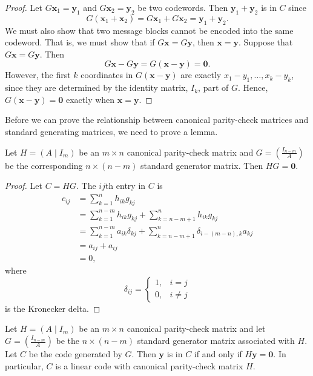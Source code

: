  
\begin{proof}
Let $G {\mathbf x}_1 = {\mathbf y}_1$ and $G {\mathbf
x}_2 ={\mathbf y}_2$ be two codewords. Then ${\mathbf y}_1
+ {\mathbf y}_2$ is in $C$ since 
\[
G( {\mathbf x}_1 + {\mathbf x}_2)
=
G {\mathbf x}_1 + G {\mathbf x}_2
=
{\mathbf y}_1 + {\mathbf y}_2.
\]
We must also show that two message blocks cannot be encoded into the
same codeword. That is, we must show that if $G {\mathbf x} = G
{\mathbf y}$, then ${\mathbf x} = {\mathbf y}$.  Suppose that $G
{\mathbf x} = G {\mathbf y}$. Then
\[
G {\mathbf x} - G {\mathbf y}
=
G( {\mathbf x} - {\mathbf y})
=
{\mathbf 0}.
\]
However, the first $k$ coordinates in $G( {\mathbf x} - {\mathbf
y})$ are exactly $x_1 -y_1, \ldots, x_k - y_k$, since they are
determined by the identity matrix, $I_k$, part of $G$. Hence, $G(
{\mathbf x} - {\mathbf y}) = {\mathbf 0}$ exactly when
${\mathbf x} = {\mathbf y}$.
\end{proof}
 
 \medskip
 
 
Before we can prove the relationship between canonical parity-check
matrices and standard generating matrices, we need to prove a lemma.
 
 
\begin{lemma}
Let $H = (A \mid I_m )$ be an $m \times n$ canonical parity-check
matrix and $G = \left( \frac{I_{n-m} }{A} \right)$ be the
corresponding $n \times (n-m)$ standard generator matrix. Then $HG =
{\mathbf 0}$. 
\end{lemma}
 
 
\begin{proof}
Let $C = HG$.  The $ij$th entry in $C$ is
\begin{align*}
c_{ij}
& = 
\sum_{k=1}^n h_{ik} g_{kj} \\
& =  \sum_{k=1}^{n-m} h_{ik} g_{kj} + \sum_{k=n-m+1}^n h_{ik} g_{kj} \\
& = \sum_{k=1}^{n-m} a_{ik} \delta_{kj} + \sum_{k=n-m+1}^n \delta_{i-(m-n),k} a_{kj} \\
& =  a_{ij} + a_{ij} \\
& = 0,
\end{align*}
where
\[
\delta_{ij}\label{notekron}
=
\begin{cases}
1, & i = j \\
0, & i \neq j
\end{cases}
\]
is the Kronecker delta.
\end{proof}
 
 
\begin{theorem}
Let $H = (A \mid I_m )$ be an $m \times n$ canonical parity-check
matrix and let $G = \left( \frac{I_{n-m} }{A} \right) $ be the $n
\times (n-m)$ standard generator matrix associated with $H$. Let $C$
be the code generated by $G$. Then ${\mathbf y}$ is in $C$ if and only
if $H {\mathbf y} = {\mathbf 0}$. In particular, $C$ is a linear code with
canonical parity-check matrix $H$. 
\end{theorem}
 
